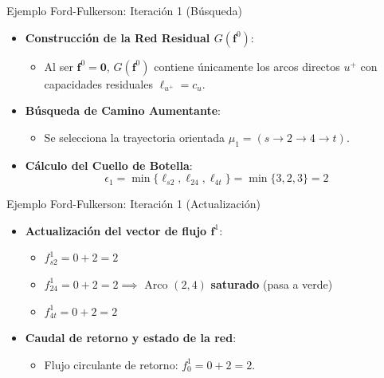 \documentclass[
  ignorenonframetext,
]{beamer}
\providecommand{\tightlist}{%
  \setlength{\itemsep}{0pt}\setlength{\parskip}{0pt}}
\begin{document}
\begin{frame}{Ejemplo Ford-Fulkerson: Iteración 1 (Búsqueda)}
\label{ejemplo-ford-fulkerson-iteraciuxf3n-1-buxfasqueda}
\begin{itemize}
\tightlist
\item
  \textbf{Construcción de la Red Residual \(G(\mathbf{f}^0)\)}:

  \begin{itemize}
  \tightlist
  \item
    Al ser \(\mathbf{f}^0 = \mathbf{0}\), \(G(\mathbf{f}^0)\) contiene
    únicamente los arcos directos \(u^+\) con capacidades residuales
    \(\ell_{u^+} = c_u\).
  \end{itemize}
\item
  \textbf{Búsqueda de Camino Aumentante}:

  \begin{itemize}
  \tightlist
  \item
    Se selecciona la trayectoria orientada
    \(\mu_1 = (s \to 2 \to 4 \to t)\).
  \end{itemize}
\item
  \textbf{Cálculo del Cuello de Botella}:
  \[\epsilon_1 = \min \{\ell_{s2}, \ell_{24}, \ell_{4t}\} = \min \{3, 2, 3\} = 2\]
\end{itemize}
\end{frame}

\begin{frame}{Ejemplo Ford-Fulkerson: Iteración 1 (Actualización)}
\label{ejemplo-ford-fulkerson-iteraciuxf3n-1-actualizaciuxf3n}
\begin{itemize}
\tightlist
\item
  \textbf{Actualización del vector de flujo \(\mathbf{f}^1\)}:

  \begin{itemize}
  \tightlist
  \item
    \(f_{s2}^1 = 0 + 2 = 2\)
  \item
    \(f_{24}^1 = 0 + 2 = 2 \implies\) Arco \((2,4)\) \textbf{saturado}
    (pasa a verde)
  \item
    \(f_{4t}^1 = 0 + 2 = 2\)
  \end{itemize}
\item
  \textbf{Caudal de retorno y estado de la red}:

  \begin{itemize}
  \tightlist
  \item
    Flujo circulante de retorno: \(f_0^1 = 0 + 2 = 2\).
  \end{itemize}
\end{itemize}
\end{frame}
\end{document}
